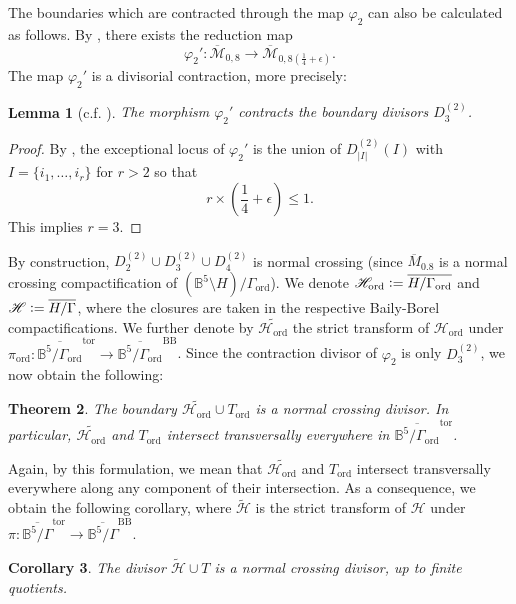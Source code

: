 \documentclass[12pt, pdftex]{amsart}
\theoremstyle{plain}
\newtheorem{thm}{Theorem}[section]
\newtheorem{lem}[thm]{Lemma}
\newtheorem{cor}[thm]{Corollary}
\theoremstyle{definition}
\numberwithin{equation}{section}
\def\B{{\mathbb B}}
\def\ord{\mathrm{ord}}
\def\tor{\mathrm{tor}}
\def\BB{\mathrm{BB}}
\def\H{\mathscr{H}}
\def\M{\mathcal{M}}
\newcommand{\defeq}{\vcentcolon=}
\begin{document}
The boundaries which are contracted through the map $\varphi_2$ can also be calculated as follows.
By \cite[Theorem 4.1]{Ha03}, there exists the reduction map
\[\varphi_2':\overline{\M}_{0,8}\to\overline{\M}_{0,8(\frac{1}{4}+\epsilon)}.\]
The map $\varphi_2'$ is a divisorial contraction, more precisely:

\begin{lem}[c.f. {\cite[Proposition 4.5]{Ha03}}]
The morphism $\varphi_2'$ contracts the boundary divisors $D_3^{(2)}$.
\end{lem}
\begin{proof}
By \cite[p1121]{KM11}, the exceptional locus of $\varphi_2'$ is the union of $D_{|I|}^{(2)}(I)$ with $I=\{i_1,\dots,i_r\}$ for $r>2$ so that 
\[r\times (\frac{1}{4}+\epsilon)\leq 1.\]
This implies $r=3$.
\end{proof}


By construction, $D^{(2)}_2\cup D^{(2)}_3 \cup D^{(2)}_4$ is normal crossing (since $\overline{M}_{0.8}$ is a normal crossing compactification of $(\B^5\setminus H)/\Gamma_{\ord}$).
We denote $\H_{\ord}\defeq\overline{H/\Gamma_{\ord}}$ and $\H\defeq\overline{H/\Gamma}$, where the closures are taken in the respective Baily-Borel compactifications.
We further denote by $\widetilde{\H_{\ord}}$ the strict transform of $\H_{\ord}$ under $\pi_{\ord}:\overline{\B^5/\Gamma_{\ord}}^{\tor}\to\overline{\B^5/\Gamma_{\ord}}^{\BB}$.
 Since the contraction divisor of $\varphi_2$ is only $D^{(2)}_3$, we now obtain the following:


\begin{thm}
\label{thm:normal_crossing_ord}
The boundary $\widetilde{\H_{\ord}}\cup T_{\ord}$ is a normal crossing divisor.
In particular, $\widetilde{\H_{\ord}}$ and $T_{\ord}$ intersect transversally everywhere in $\overline{\B^5/\Gamma_{\ord}}^{\tor}$.
\end{thm}
Again, by this formulation, we mean that $\widetilde{\H_{\ord}}$ and $T_{\ord}$ intersect  transversally everywhere along any component of their intersection. 
As a consequence, we obtain the following corollary, 
where $\widetilde{\H}$ is the strict transform of $\H$ under $\pi:\overline{\B^5/\Gamma}^{\tor}\to\overline{\B^5/\Gamma}^{\BB}$.
\begin{cor}
The divisor $\widetilde{\H}\cup T$ is a  normal crossing divisor, up to finite quotients.
\end{cor}
\end{document}
